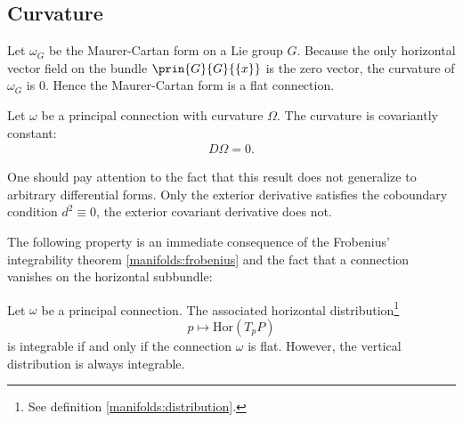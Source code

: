 \subsection{Curvature}

    \begin{example}
        Let $\omega_G$ be the Maurer-Cartan form on a Lie group $G$. Because the only horizontal vector field on the bundle $\prin{G}{G}{\{x\}}$ is the zero vector, the curvature of $\omega_G$ is 0. Hence the Maurer-Cartan form is a flat connection.
    \end{example}

    \begin{property}
        Let $\omega$ be a principal connection with curvature $\Omega$. The curvature is covariantly constant:
        \begin{gather}
            D\Omega = 0.
        \end{gather}
    \end{property}
    \begin{remark}
        One should pay attention to the fact that this result\mnote{\dbend} does not generalize to arbitrary differential forms. Only the exterior derivative satisfies the coboundary condition $d^2 \equiv 0$, the exterior covariant derivative does not.
    \end{remark}


    The following property is an immediate consequence of the Frobenius' integrability theorem \ref{manifolds:frobenius} and the fact that a connection vanishes on the horizontal subbundle:
    \begin{property}
        Let $\omega$ be a principal connection. The associated horizontal distribution\footnote{See definition \ref{manifolds:distribution}.} \[p\mapsto\text{Hor}(T_pP)\] is integrable if and only if the connection $\omega$ is flat. However, the vertical distribution is always integrable.
    \end{property}

